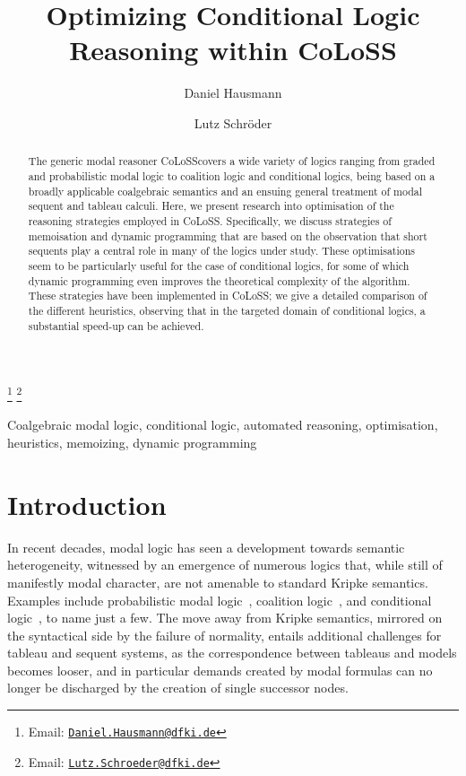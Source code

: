 \documentclass{entcs} \usepackage{entcsmacro}
\newcommand{\COLOSS}{{\textrm CoLoSS}}
\begin{document}
\begin{frontmatter}
  \title{Optimizing Conditional Logic Reasoning within \COLOSS}
  \author[DFKI]{Daniel Hausmann}
  \author[DFKI,UBremen]{Lutz Schr\"oder}
  \address[DFKI]{DFKI Bremen, SKS}
  \address[UBremen]{Department of Mathematics and Computer Science, Universit\"at Bremen, Germany}
  \thanks[myemail]{Email: \href{mailto:Daniel.Hausmann@dfki.de} {\texttt{\normalshape Daniel.Hausmann@dfki.de}}}
  \thanks[coemail]{Email: \href{mailto:Lutz.Schroeder@dfki.de} {\texttt{\normalshape Lutz.Schroeder@dfki.de}}}
\begin{abstract} 
  The generic modal reasoner \COLOSS covers a wide variety of logics
  ranging from graded and probabilistic modal logic to coalition logic
  and conditional logics, being based on a broadly applicable
  coalgebraic semantics and an ensuing general treatment of modal
  sequent and tableau calculi. Here, we present research into
  optimisation of the reasoning strategies employed in
  \COLOSS. Specifically, we discuss strategies of memoisation and
  dynamic programming that are based on the observation that short
  sequents play a central role in many of the logics under
  study. These optimisations seem to be particularly useful for the
  case of conditional logics, for some of which dynamic programming
  even improves the theoretical complexity of the algorithm. These
  strategies have been implemented in \COLOSS; we give a detailed
  comparison of the different heuristics, observing that in the
  targeted domain of conditional logics, a substantial speed-up can be
  achieved.
\end{abstract}
\begin{keyword}
  Coalgebraic modal logic, conditional logic, automated reasoning,
  optimisation, heuristics, memoizing, dynamic programming
\end{keyword}
\end{frontmatter}
\section{Introduction}\label{intro}

In recent decades, modal logic has seen a development towards semantic
heterogeneity, witnessed by an emergence of numerous logics that,
while still of manifestly modal character, are not amenable to
standard Kripke semantics. Examples include probabilistic modal
logic~\cite{FaginHalpern94}, coalition logic~\cite{Pauly02}, and
conditional logic~\cite{Chellas80}, to name just a few. The move away
from Kripke semantics, mirrored on the syntactical side by the failure
of normality, entails additional challenges for tableau and sequent
systems, as the correspondence between tableaus and models becomes
looser, and in particular demands created by modal formulas can no
longer be discharged by the creation of single successor nodes. 
\end{document}
